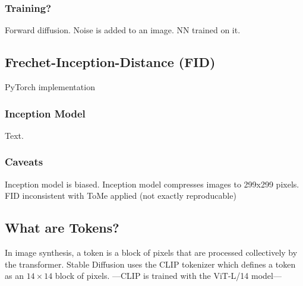 \subsubsection{Training?}
Forward diffusion. Noise is added to an image. NN trained on it.



\subsection{Frechet-Inception-Distance (FID)}
PyTorch implementation\cite{Seitzer2020FID}



\subsubsection{Inception Model}
Text.




\subsubsection{Caveats}
Inception model is biased. Inception model compresses images to 299x299 pixels. FID inconsistent with ToMe applied (not exactly reproducable)



\subsection{What are Tokens?}
In image synthesis, a token is a block of pixels that are processed collectively by the transformer. Stable Diffusion uses the CLIP tokenizer \cite{radford2021learning} which defines a token as an $14 \times 14$ block of pixels. ---CLIP is trained with the ViT-L/14 model---